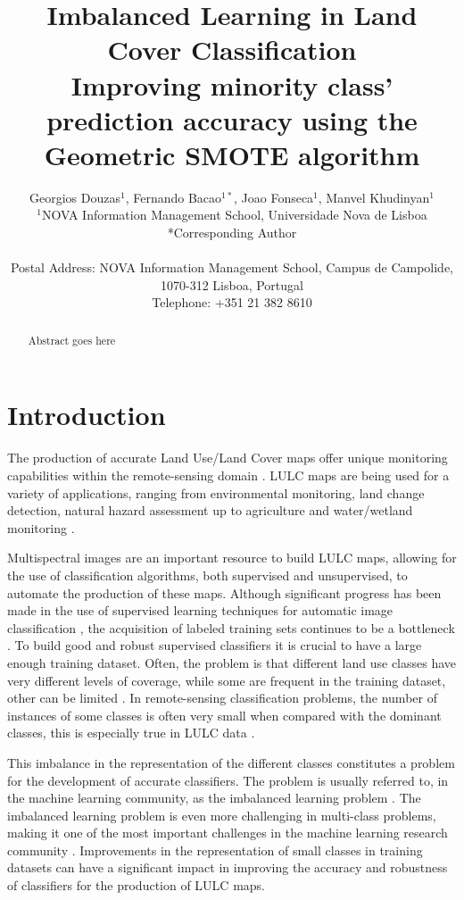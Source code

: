 \documentclass[parskip=full]{scrartcl}
\title{Imbalanced Learning in Land Cover Classification  \\ \LARGE{Improving minority class' prediction accuracy using the Geometric SMOTE algorithm}}
\author{
	Georgios Douzas\(^{1}\), Fernando Bacao\(^{1*}\), Joao Fonseca\(^{1}\), Manvel Khudinyan\(^{1}\)
	\\
	\small{\(^{1}\)NOVA Information Management School, Universidade Nova de Lisboa}
	\\
	\small{*Corresponding Author}
	\\
	\\
	\small{Postal Address: NOVA Information Management School, Campus de Campolide, 1070-312 Lisboa, Portugal}
	\\
	\small{Telephone: +351 21 382 8610}
}
\date{}
\begin{document}
\maketitle

\begin{abstract}
Abstract goes here
\end{abstract}

\section{Introduction}

The production of accurate Land Use/Land Cover maps offer unique monitoring
capabilities within the remote-sensing domain \cite{Mellor2015}. LULC maps are
being used for a variety of applications, ranging from environmental
monitoring, land change detection, natural hazard assessment up to agriculture
and water/wetland monitoring \cite{Khatami2016}.

Multispectral images are an important resource to build LULC maps, allowing for
the use of classification algorithms, both supervised and unsupervised, to
automate the production of these maps. Although significant progress has been
made in the use of supervised learning techniques for automatic image
classification \cite{Tewkesbury2015}, the acquisition of labeled training sets
continues to be a bottleneck \cite{Rajan2008}. To build  good and robust
supervised classifiers it is crucial to have a large enough training dataset.
Often, the problem is that different land use classes have very different
levels of coverage, while some are frequent in the training dataset, other can
be limited \cite{Feng2019}. In remote-sensing classification problems, the
number of instances of some classes is often very small when compared with the
dominant classes, this is especially true in LULC data \cite{Williams2009,
Cenggoro2018}.

This imbalance in the representation of the different classes constitutes a
problem for the development of accurate classifiers. The problem is usually
referred to, in the machine learning community, as the imbalanced learning
problem \cite{Chawla2004}. The imbalanced learning problem is even more
challenging in multi-class problems, making it one of the most
important challenges in the machine learning research community
\cite{Garcia2018}. Improvements in the representation of small classes in
training datasets can have a significant impact in improving the accuracy and
robustness of classifiers for the production of LULC maps.
\end{document}
